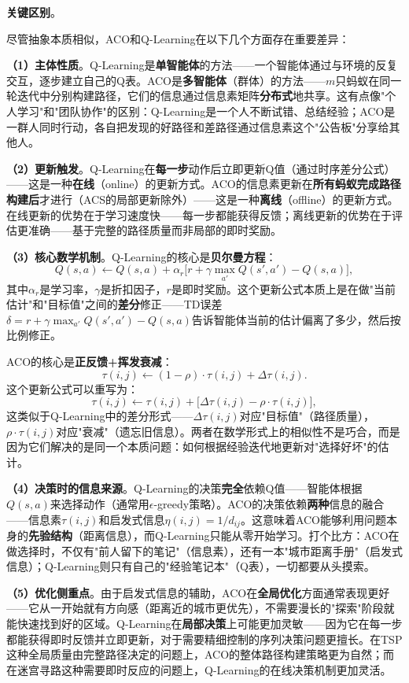 \documentclass[lang=cn,zihao=-4,a4paper,fontset=windows]{beautybook}
\begin{document}
\textbf{关键区别}。

尽管抽象本质相似，ACO和Q-Learning在以下几个方面存在重要差异：

\textbf{（1）主体性质}。Q-Learning是\textbf{单智能体}的方法——一个智能体通过与环境的反复交互，逐步建立自己的Q表。ACO是\textbf{多智能体}（群体）的方法——$m$只蚂蚁在同一轮迭代中分别构建路径，它们的信息通过信息素矩阵\textbf{分布式}地共享。这有点像"个人学习"和"团队协作"的区别：Q-Learning是一个人不断试错、总结经验；ACO是一群人同时行动，各自把发现的好路径和差路径通过信息素这个"公告板"分享给其他人。

\textbf{（2）更新触发}。Q-Learning在\textbf{每一步}动作后立即更新Q值（通过时序差分公式）——这是一种\textbf{在线}（online）的更新方式。ACO的信息素更新在\textbf{所有蚂蚁完成路径构建后}才进行（ACS的局部更新除外）——这是一种\textbf{离线}（offline）的更新方式。在线更新的优势在于学习速度快——每一步都能获得反馈；离线更新的优势在于评估更准确——基于完整的路径质量而非局部的即时奖励。

\textbf{（3）核心数学机制}。Q-Learning的核心是\textbf{贝尔曼方程}：
\[
Q(s,a) \leftarrow Q(s,a) + \alpha_r \big[r + \gamma \max_{a'} Q(s',a') - Q(s,a)\big],
\]
其中$\alpha_r$是学习率，$\gamma$是折扣因子，$r$是即时奖励。这个更新公式本质上是在做"当前估计"和"目标值"之间的\textbf{差分}修正——TD误差$\delta = r + \gamma \max_{a'} Q(s',a') - Q(s,a)$告诉智能体当前的估计偏离了多少，然后按比例修正。

ACO的核心是\textbf{正反馈+挥发衰减}：
\[
\tau(i,j) \leftarrow (1-\rho) \cdot \tau(i,j) + \Delta\tau(i,j).
\]
这个更新公式可以重写为：
\[
\tau(i,j) \leftarrow \tau(i,j) + \big[\Delta\tau(i,j) - \rho \cdot \tau(i,j)\big],
\]
这类似于Q-Learning中的差分形式——$\Delta\tau(i,j)$对应"目标值"（路径质量），$\rho \cdot \tau(i,j)$对应"衰减"（遗忘旧信息）。两者在数学形式上的相似性不是巧合，而是因为它们解决的是同一个本质问题：如何根据经验迭代地更新对"选择好坏"的估计。

\textbf{（4）决策时的信息来源}。Q-Learning的决策\textbf{完全}依赖Q值——智能体根据$Q(s,a)$来选择动作（通常用$\epsilon$-greedy策略）。ACO的决策依赖\textbf{两种}信息的融合——信息素$\tau(i,j)$和启发式信息$\eta(i,j) = 1/d_{ij}$。这意味着ACO能够利用问题本身的\textbf{先验结构}（距离信息），而Q-Learning只能从零开始学习。打个比方：ACO在做选择时，不仅有"前人留下的笔记"（信息素），还有一本"城市距离手册"（启发式信息）；Q-Learning则只有自己的"经验笔记本"（Q表），一切都要从头摸索。

\textbf{（5）优化侧重点}。由于启发式信息的辅助，ACO在\textbf{全局优化}方面通常表现更好——它从一开始就有方向感（距离近的城市更优先），不需要漫长的"探索"阶段就能快速找到好的区域。Q-Learning在\textbf{局部决策}上可能更加灵敏——因为它在每一步都能获得即时反馈并立即更新，对于需要精细控制的序列决策问题更擅长。在TSP这种全局质量由完整路径决定的问题上，ACO的整体路径构建策略更为自然；而在迷宫寻路这种需要即时反应的问题上，Q-Learning的在线决策机制更加灵活。
\end{document}
